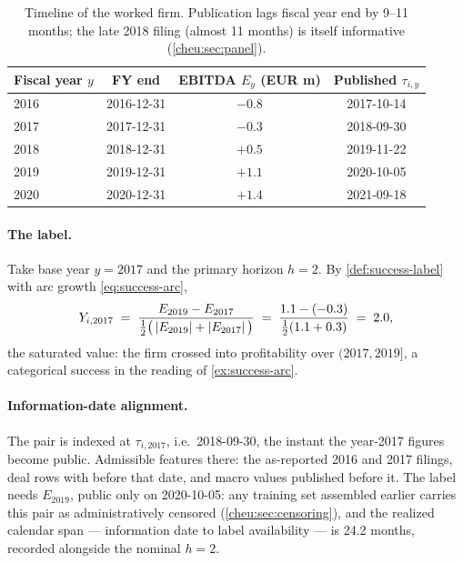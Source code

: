 \begin{table}[htbp]
\centering
\small
\begin{tabular}{lccc}
\toprule
Fiscal year $y$ & FY end & EBITDA $E_y$ (EUR m) & Published
$\tau_{i,y}$ \\
\midrule
2016 & 2016-12-31 & $-0.8$ & 2017-10-14 \\
2017 & 2017-12-31 & $-0.3$ & 2018-09-30 \\
2018 & 2018-12-31 & $+0.5$ & 2019-11-22 \\
2019 & 2019-12-31 & $+1.1$ & 2020-10-05 \\
2020 & 2020-12-31 & $+1.4$ & 2021-09-18 \\
\bottomrule
\end{tabular}
\caption{Timeline of the worked firm. Publication lags fiscal year end
by 9--11 months; the late 2018 filing (almost 11 months) is itself
informative (\cref{cheu:sec:panel}).}
\label{cheu:tab:timeline}
\end{table}

\paragraph{The label.} Take base year $y = 2017$ and the primary horizon $h = 2$. By
\cref{def:success-label} with arc growth \cref{eq:success-arc},
\begin{equation}\label{eq:success-worked-label}
Y_{i,2017} \;=\; \frac{E_{2019} - E_{2017}}{\tfrac{1}{2}\big(
\left|E_{2019}\right| + \left|E_{2017}\right|\big)}
\;=\; \frac{1.1 - (-0.3)}{\tfrac{1}{2}(1.1 + 0.3)} \;=\; 2.0,
\end{equation}
the saturated value: the firm crossed into profitability over $(2017, 2019]$, a categorical
success in the reading of \cref{ex:success-arc}.

\paragraph{Information-date alignment.} The pair is indexed at $\tau_{i,2017}$, i.e.\
2018-09-30, the instant the year-2017 figures become public. Admissible features there: the
as-reported 2016 and 2017 filings, deal rows with \code{deal\_date} before that date, and macro
values published before it. The label needs $E_{2019}$, public only on 2020-10-05: any training
set assembled earlier carries this pair as administratively censored
(\cref{cheu:sec:censoring}), and the realized calendar span --- information date to label
availability --- is 24.2 months, recorded alongside the nominal $h = 2$.

